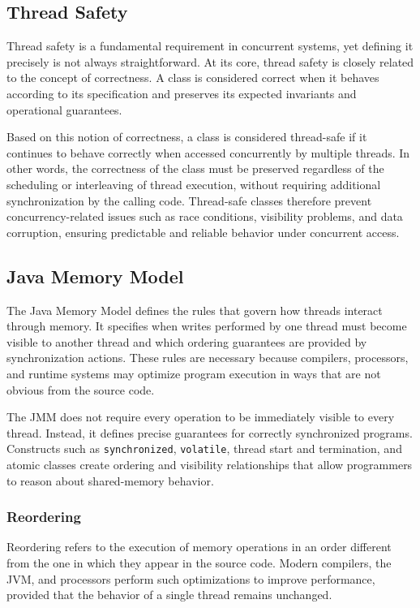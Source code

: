 \subsection{Thread Safety}
Thread safety is a fundamental requirement in concurrent systems, yet defining it precisely is not always straightforward. At its core, thread safety is closely related to the concept of correctness. A class is considered correct when it behaves according to its specification and preserves its expected invariants and operational guarantees. \cite{java-concurrency}

Based on this notion of correctness, a class is considered thread-safe if it continues to behave correctly when accessed concurrently by multiple threads. In other words, the correctness of the class must be preserved regardless of the scheduling or interleaving of thread execution, without requiring additional synchronization by the calling code. Thread-safe classes therefore prevent concurrency-related issues such as race conditions, visibility problems, and data corruption, ensuring predictable and reliable behavior under concurrent access. \cite{java-concurrency}

\subsection{Java Memory Model}
The Java Memory Model defines the rules that govern how threads interact through memory. It specifies when writes performed by one thread must become visible to another thread and which ordering guarantees are provided by synchronization actions. These rules are necessary because compilers, processors, and runtime systems may optimize program execution in ways that are not obvious from the source code. \cite{java-concurrency}\cite{jsr133-faq}

The JMM does not require every operation to be immediately visible to every thread. Instead, it defines precise guarantees for correctly synchronized programs. Constructs such as \texttt{synchronized}, \texttt{volatile}, thread start and termination, and atomic classes create ordering and visibility relationships that allow programmers to reason about shared-memory behavior. \cite{java-concurrency}\cite{jsr133-faq}

\subsubsection{Reordering}
Reordering refers to the execution of memory operations in an order different from the one in which they appear in the source code. Modern compilers, the JVM, and processors perform such optimizations to improve performance, provided that the behavior of a single thread remains unchanged. \cite{java-concurrency}\cite{jsr133-faq}

